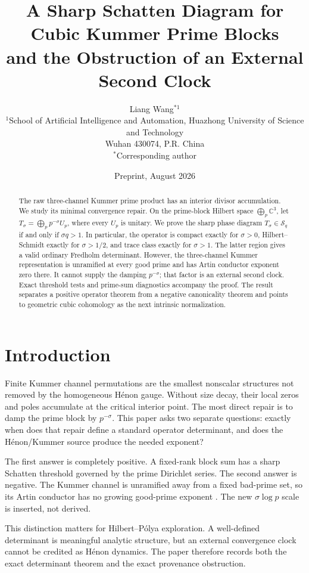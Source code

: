 \documentclass[11pt]{article}
\title{A Sharp Schatten Diagram for Cubic Kummer Prime Blocks\\
and the Obstruction of an External Second Clock}
\author{Liang Wang$^{*1}$\\
\small $^{1}$School of Artificial Intelligence and Automation, Huazhong University of Science and Technology\\
\small Wuhan 430074, P.R. China\\
\small $^*$Corresponding author}
\date{Preprint, August 2026}
\theoremstyle{remark}\newtheorem{remark}[theorem]{Remark}
\begin{document}
\maketitle
\begin{abstract}
The raw three-channel Kummer prime product has an interior divisor
accumulation.  We study its minimal convergence repair.  On the prime-block
Hilbert space \(\bigoplus_p\mathbb C^3\), let
\(T_\sigma=\bigoplus_p p^{-\sigma}U_p\), where every \(U_p\) is unitary.  We
prove the sharp phase diagram
\(T_\sigma\in\mathcal S_q\) if and only if \(\sigma q>1\).  In particular,
the operator is compact exactly for \(\sigma>0\), Hilbert--Schmidt exactly
for \(\sigma>1/2\), and trace class exactly for \(\sigma>1\).  The latter
region gives a valid ordinary Fredholm determinant.  However, the
three-channel Kummer representation is unramified at every good prime and
has Artin conductor exponent zero there.  It cannot supply the damping
\(p^{-\sigma}\); that factor is an external second clock.  Exact threshold
tests and prime-sum diagnostics accompany the proof.  The result separates a
positive operator theorem from a negative canonicality theorem and points to
geometric cubic cohomology as the next intrinsic normalization.
\end{abstract}

\section{Introduction}
Finite Kummer channel permutations are the smallest nonscalar structures not
removed by the homogeneous H\'enon gauge.  Without size decay, their local
zeros and poles accumulate at the critical interior point.  The most direct
repair is to damp the prime block by \(p^{-\sigma}\).  This paper asks two
separate questions: exactly when does that repair define a standard
operator determinant, and does the H\'enon/Kummer source produce the needed
exponent?

The first answer is completely positive.  A fixed-rank block sum has a sharp
Schatten threshold governed by the prime Dirichlet series.  The second answer
is negative.  The Kummer channel is unramified away from a fixed bad-prime
set, so its Artin conductor has no growing good-prime exponent
\cite{Serre1979}.  The new \(\sigma\log p\) scale is inserted, not derived.

This distinction matters for Hilbert--P\'olya exploration.  A well-defined
determinant is meaningful analytic structure, but an external convergence
clock cannot be credited as H\'enon dynamics.  The paper therefore records
both the exact determinant theorem and the exact provenance obstruction.
\end{document}
